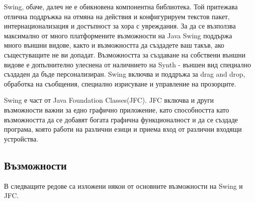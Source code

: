 Swing, обаче, далеч не е обикновена компонентна библиотека. Той
притежава отлична поддръжка на отмяна на действия и конфигурируем
текстов пакет, интернационализация и достъпност за хора с
увреждания. За да се възползва максимално от много платформените
възможности на Java Swing поддържа много външни видове, както и
възможността да създадете ваш такъв, ако същестуващите не ви допадат.
Възможността за създаване на собствени външни видове е допълнително
улеснена от наличнието на Synth - външен вид специално създаден да
бъде персонализиран. Swing включва и поддръжа за drag and drop,
обработка на съобщения, специално изрисуване и управление на
прозорците.

Swing е част от Java Foundation Classes(JFC). JFC включва и други
възможности важни за едно графично приложение, като способността като
възможността да се добавят богата графична функционалност и да се
създаде програма, която работи на различни езици и приема вход от
различни входящи устройства.
\subsection{Възможности}
В следващите редове са изложени някои от основните възможности на
Swing и JFC.

